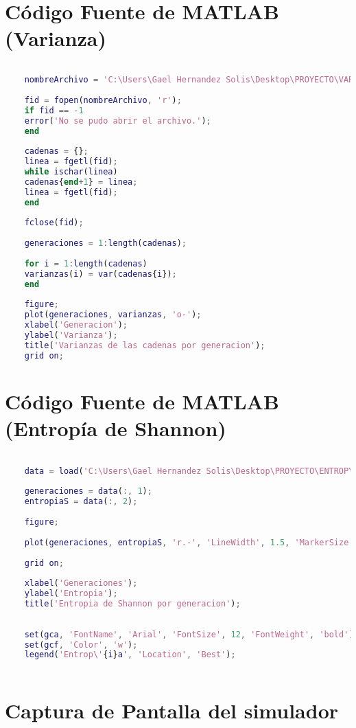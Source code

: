\documentclass{article}
\begin{document}
	\section{Código Fuente de MATLAB (Varianza)}
	\begin{lstlisting}[language=Matlab, basicstyle=\tiny, breaklines=true, breakatwhitespace=true]
	
	nombreArchivo = 'C:\Users\Gael Hernandez Solis\Desktop\PROYECTO\VARIANZA.txt';  
	
	fid = fopen(nombreArchivo, 'r');
	if fid == -1
	error('No se pudo abrir el archivo.');
	end
	
	cadenas = {};
	linea = fgetl(fid);
	while ischar(linea)
	cadenas{end+1} = linea;
	linea = fgetl(fid);
	end
	
	fclose(fid);
	
	generaciones = 1:length(cadenas); 
	
	for i = 1:length(cadenas)
	varianzas(i) = var(cadenas{i}); 
	end
	
	figure;
	plot(generaciones, varianzas, 'o-'); 
	xlabel('Generacion');
	ylabel('Varianza');
	title('Varianzas de las cadenas por generacion');
	grid on;	
	\end{lstlisting}
	
	\section{Código Fuente de MATLAB (Entropía de Shannon)}
	\begin{lstlisting}[language=Matlab, basicstyle=\tiny, breaklines=true, breakatwhitespace=true]

	data = load('C:\Users\Gael Hernandez Solis\Desktop\PROYECTO\ENTROPY.txt');
	
	generaciones = data(:, 1);
	entropiaS = data(:, 2);
	
	figure;
	
	plot(generaciones, entropiaS, 'r.-', 'LineWidth', 1.5, 'MarkerSize', 10);
	
	grid on;
	
	xlabel('Generaciones');
	ylabel('Entropia');
	title('Entropia de Shannon por generacion');
	
	
	set(gca, 'FontName', 'Arial', 'FontSize', 12, 'FontWeight', 'bold');
	set(gcf, 'Color', 'w');
	legend('Entrop\'{i}a', 'Location', 'Best');
		
	\end{lstlisting}
	
	\section{Captura de Pantalla del simulador}
	
\end{document}
